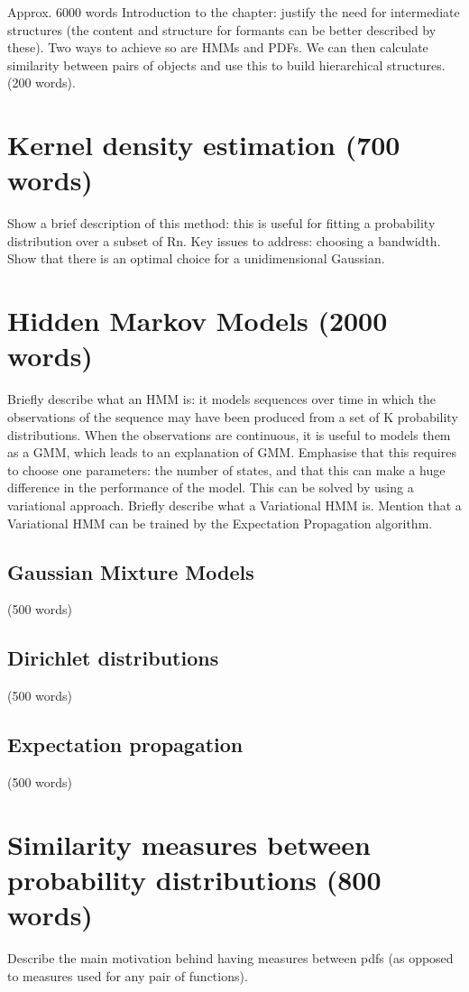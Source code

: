 \documentclass[../main.tex]{subfiles}
\begin{document}
Approx. 6000 words
Introduction to the chapter: justify the need for intermediate structures (the content and structure for formants can be better described by these). Two ways to achieve so are HMMs and PDFs. We can then calculate similarity between pairs of objects and use this to build hierarchical structures. (200 words).

\section{ Kernel density estimation  (700 words)}
Show a brief description of this method: this is useful for fitting a probability distribution over a subset of Rn. Key issues to address: choosing a bandwidth. Show that there is an optimal choice for a unidimensional Gaussian.
\section{ Hidden Markov Models (2000 words)}
Briefly describe what an HMM is: it models sequences over time in which the observations of the sequence may have been produced from a set of K probability distributions. When the observations are continuous, it is useful to models them as a GMM, which leads to an explanation of GMM. Emphasise that this requires to choose one parameters: the number of states, and that this can make a huge difference in the performance of the model. This can be solved by using a variational approach. Briefly describe what a Variational HMM is. Mention that a Variational HMM can be trained by the Expectation Propagation algorithm.
\subsection{ Gaussian Mixture Models } (500 words)
\subsection{ Dirichlet distributions } (500 words)
\subsection{ Expectation propagation } (500 words)
\section{ Similarity measures between probability distributions (800 words)}
Describe the main motivation behind having measures between pdfs (as opposed to measures used for any pair of functions).
\end{document}

